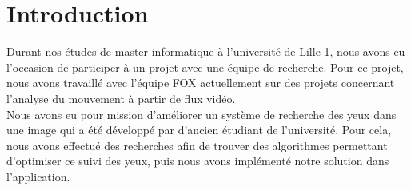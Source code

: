 \section*{Introduction}
Durant nos études de master informatique à l'université de Lille 1, nous avons eu l'occasion de participer à un projet
avec une équipe de recherche. Pour ce projet, nous avons travaillé avec l'équipe FOX actuellement sur des projets
concernant l'analyse du mouvement à partir de flux vidéo.\\

Nous avons eu pour mission d'améliorer un système de recherche des yeux dans une image qui a été développé 
par d'ancien étudiant de l'université. Pour cela, nous avons effectué des recherches afin de trouver des 
algorithmes permettant d'optimiser ce suivi des yeux, puis nous avons implémenté notre solution dans l'application.

\newpage